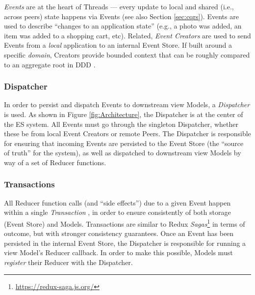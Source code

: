 \documentclass{textile}
\begin{document}
\emph{Events} are at the heart of Threads --- every update to local and shared (i.e., across peers) state happens via Events (see also Section \ref{sec:cqrs}). Events are used to describe ``changes to an application state'' \cite{fowlerEventSourcing} (e.g., a photo was added, an item was added to a shopping cart, etc). Related, \emph{Event Creators} are used to send Events from a \emph{local} application to an internal Event Store. If built around a specific \emph{domain}, Creators provide bounded context that can be roughly compared to an aggregate root in DDD \cite{evansDomaindrivenDesignTackling2004a}.

\subsubsection{Dispatcher}\label{sec:dispatcher}

In order to persist and dispatch Events to downstream view Models, a \emph{Dispatcher} is used. As shown in Figure \ref{fig:Architecture}, the Dispatcher is at the center of the ES system. All Events must go through the singleton Dispatcher, whether these be from local Event Creators or remote Peers. The Dispatcher is responsible for ensuring that incoming Events are persisted to the Event Store (the ``source of truth'' for the system), as well as dispatched to downstream view Models by way of a set of Reducer functions.


\subsubsection{Transactions}\label{sec:transactions}

All Reducer function calls (and ``side effects'') due to a given Event happen within a single \emph{Transaction} \cite{haerderPrinciplesTransactionorientedDatabase1983}, in order to ensure consistently of both storage (Event Store) and Models. Transactions are similar to Redux \emph{Sagas}\footnote{\url{https://redux-saga.js.org/}} in terms of outcome, but with stronger consistency guarantees. Once an Event has been persisted in the internal Event Store, the Dispatcher is responsible for running a view Model's Reducer callback. In order to make this possible, Models must \emph{register} their Reducer with the Dispatcher.
\end{document}

